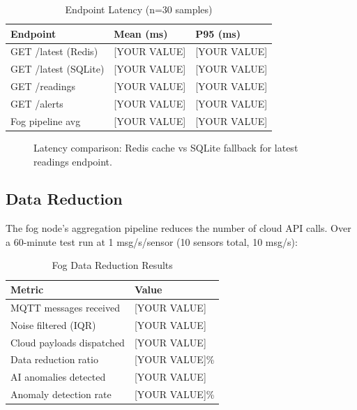 \documentclass[conference]{IEEEtran}
\begin{document}
\begin{table}[H]
\caption{Endpoint Latency (n=30 samples)}
\label{tab:latency}
\begin{tabularx}{\columnwidth}{lXX}
\toprule
\textbf{Endpoint} & \textbf{Mean (ms)} & \textbf{P95 (ms)} \\
\midrule
GET /latest (Redis)  & [YOUR VALUE] & [YOUR VALUE] \\
GET /latest (SQLite) & [YOUR VALUE] & [YOUR VALUE] \\
GET /readings        & [YOUR VALUE] & [YOUR VALUE] \\
GET /alerts          & [YOUR VALUE] & [YOUR VALUE] \\
Fog pipeline avg     & [YOUR VALUE] & [YOUR VALUE] \\
\bottomrule
\end{tabularx}
\end{table}

\begin{figure}[H]
    \centering
    \caption{Latency comparison: Redis cache vs SQLite fallback for latest readings endpoint.}
    \label{fig:latency}
\end{figure}

\subsection{Data Reduction}

The fog node's aggregation pipeline reduces the number of cloud API calls. Over a 60-minute test run at 1 msg/s/sensor (10 sensors total, 10 msg/s):

\begin{table}[H]
\caption{Fog Data Reduction Results}
\label{tab:reduction}
\begin{tabularx}{\columnwidth}{lX}
\toprule
\textbf{Metric} & \textbf{Value} \\
\midrule
MQTT messages received     & [YOUR VALUE] \\
Noise filtered (IQR)       & [YOUR VALUE] \\
Cloud payloads dispatched  & [YOUR VALUE] \\
Data reduction ratio       & [YOUR VALUE]\% \\
AI anomalies detected      & [YOUR VALUE] \\
Anomaly detection rate     & [YOUR VALUE]\% \\
\bottomrule
\end{tabularx}
\end{table}
\end{document}
